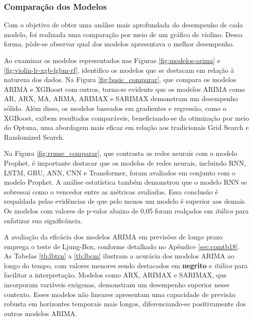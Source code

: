\subsubsection{Compara\c c\~ao dos Modelos}

Com o objetivo de obter uma análise mais aprofundada do desempenho de cada modelo, foi realizada uma comparação por meio de um gráfico de violino. Dessa forma, pôde-se observar qual dos modelos apresentava o melhor desempenho.



Ao examinar os modelos representados nas Figuras \ref{fig:modelos-arima} e \ref{fig:violin-lr-xgb-lgbm-rf}, identifico os modelos que se destacam em relação à natureza dos dados. Na Figura \ref{fig:basic_comparar}, que compara os modelos ARIMA e XGBoost com outros, torna-se evidente que os modelos ARIMA como AR, ARX, MA, ARMA, ARIMAX e SARIMAX demonstram um desempenho sólido. Além disso, os modelos baseados em gradientes e regressão, como o XGBoost, exibem resultados comparáveis, beneficiando-se da otimização por meio do Optuna, uma abordagem mais eficaz em relação aos tradicionais Grid Search e Randomized Search.

Na Figura \ref{fig:rrmse_comparar}, que contrasta as redes neurais com o modelo Prophet, é importante destacar que os modelos de redes neurais, incluindo RNN, LSTM, GRU, ANN, CNN e Transformer, foram avaliados em conjunto com o modelo Prophet. A análise estatística também demonstrou que o modelo RNN se sobressai como o vencedor entre as métricas avaliadas. Essa conclusão é respaldada pelas evidências de que pelo menos um modelo é superior aos demais. Os modelos com valores de p-valor abaixo de 0,05 foram realçados em \textit{itálico} para enfatizar sua significância.

A avaliação da eficácia dos modelos ARIMA em previsões de longo prazo emprega o teste de Ljung-Box, conforme detalhado no Apêndice \ref{sec:comtb18}. As Tabelas \ref{tb:lbtrn} a \ref{tb:lbcm} ilustram a acurácia dos modelos ARIMA ao longo do tempo, com valores menores sendo destacados em \textbf{negrito} e \textit{itálico} para facilitar a interpretação. Modelos como ARX, ARIMAX e SARIMAX, que incorporam variáveis exógenas, demonstram um desempenho superior nesse contexto. Esses modelos não lineares apresentam uma capacidade de previsão robusta em horizontes temporais mais longos, diferenciando-se positivamente dos outros modelos ARIMA.

